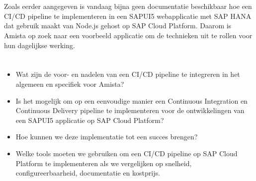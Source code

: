 \section{}
\label{sec:probleemstelling}

Zoals eerder aangegeven is vandaag bijna geen documentatie beschikbaar hoe een CI/CD pipeline te implementeren in een SAPUI5 webapplicatie met SAP HANA dat gebruik maakt van Node.js gehost op SAP Cloud Platform. 
Daarom is Amista op zoek naar een voorbeeld applicatie om de technieken uit te rollen voor hun dagelijkse werking.

\section{}
\label{sec:onderzoeksvraag}

\begin{itemize}
    \item Wat zijn de voor- en nadelen van een CI/CD pipeline te integreren in het algemeen en specifiek voor Amista?
    \item Is het mogelijk om op een eenvoudige manier een Continuous Integration en Continuous Delivery pipeline te implementeren voor de ontwikkelingen van een SAPUI5 applicatie op SAP Cloud Platform?
    \item Hoe kunnen we deze implementatie tot een succes brengen?
    \item Welke tools moeten we gebruiken om een CI/CD pipeline op SAP Cloud Platform te implementeren als we vergelijken op snelheid, configureerbaarheid, documentatie en kostprijs.
\end{itemize}

